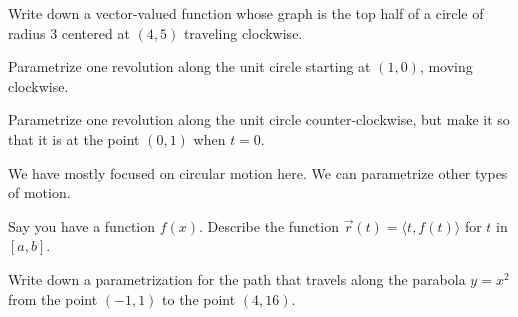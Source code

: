 \begin{ex}
    Write down a vector-valued function whose graph is the top half of a circle of radius 3 centered at $(4,5)$ traveling clockwise.
\end{ex}

\vfill

\begin{ex}
    Parametrize one revolution along the unit circle starting at $(1,0)$, moving clockwise.
\end{ex}

\vfill

\pagebreak

\begin{ex}
    Parametrize one revolution along the unit circle counter-clockwise, but make it so that it is at the point $(0,1)$ when $t=0$.
\end{ex}

\vfill

We have mostly focused on circular motion here. We can parametrize other types of motion.

\begin{ex}
    Say you have a function $f(x)$. Describe the function $\vec{r}(t)=\langle t, f(t)\rangle$ for $t$ in $[a,b]$.
\end{ex}

\vfill

\begin{ex}
    Write down a parametrization for the path that travels along the parabola $y=x^2$ from the point $(-1,1)$ to the point $(4,16)$.
\end{ex}

\vfill 


